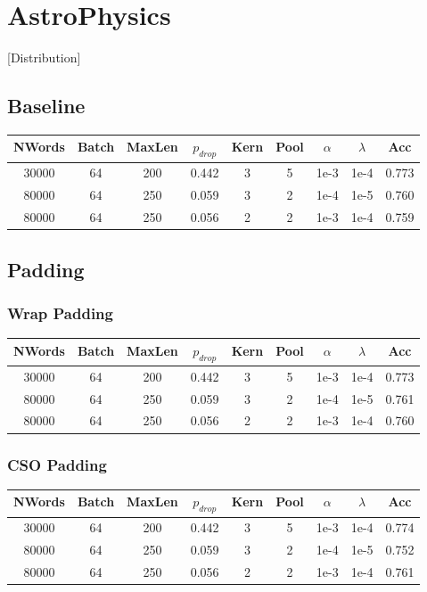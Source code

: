 \section{AstroPhysics}
[Distribution]
\subsection{Baseline}
\begin{center}\begin{tabular}{||c c c c c c c c c||}
 \hline
 NWords & Batch & MaxLen & $p_{drop}$ & Kern & Pool & $\alpha$ & $\lambda$ & Acc\\ [0.5ex]
 \hline\hline
 30000 & 64 & 200 & 0.442 & 3 & 5 & 1e-3 & 1e-4 & 0.773\\
 \hline
 80000 & 64 & 250 & 0.059 & 3 & 2 & 1e-4 & 1e-5 & 0.760\\
 \hline
 80000 & 64 & 250 & 0.056 & 2 & 2 & 1e-3 & 1e-4 & 0.759\\
 [1ex]\hline\end{tabular}\end{center}

\subsection{Padding}
\subsubsection{Wrap Padding}
\begin{center}\begin{tabular}{||c c c c c c c c c ||}
 \hline
 NWords & Batch & MaxLen & $p_{drop}$ & Kern & Pool & $\alpha$ & $\lambda$ & Acc\\ [0.5ex]
 \hline\hline
 30000 & 64 & 200 & 0.442 & 3 & 5 & 1e-3 & 1e-4 & 0.773\\
 \hline
 80000 & 64 & 250 & 0.059 & 3 & 2 & 1e-4 & 1e-5 & 0.761\\
 \hline
 80000 & 64 & 250 & 0.056 & 2 & 2 & 1e-3 & 1e-4 & 0.760\\
 [1ex]\hline\end{tabular}\end{center}

\subsubsection{CSO Padding}
\begin{center}\begin{tabular}{||c c c c c c c c c ||}
 \hline
 NWords & Batch & MaxLen & $p_{drop}$ & Kern & Pool & $\alpha$ & $\lambda$ & Acc\\ [0.5ex]
 \hline\hline
30000 & 64 & 200 & 0.442 & 3 & 5 & 1e-3 & 1e-4 & 0.774\\
\hline
80000 & 64 & 250 & 0.059 & 3 & 2 & 1e-4 & 1e-5 & 0.752\\
\hline
80000 & 64 & 250 & 0.056 & 2 & 2 & 1e-3 & 1e-4 & 0.761\\
 [1ex]\hline\end{tabular}\end{center}

